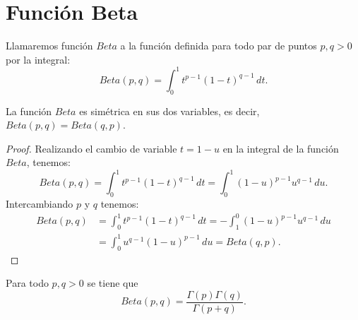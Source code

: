 \section{Función Beta}
\begin{definition}
    Llamaremos función $Beta$  a la función definida
    para todo par de puntos $p,q>0$ por la integral:
    \[
    Beta(p,q)=\int_{0}^{1}t^{p-1}(1-t)^{q-1}\,dt.    
    \]
\end{definition}


\begin{theorem}
    La función $Beta$ es simétrica en sus dos variables, es decir,
    $Beta(p,q)=Beta(q,p)$.
\end{theorem}

\begin{proof}
    Realizando el cambio de variable $t = 1-u$ en la integral
    de la función $Beta$, tenemos:
    \[
        Beta(p,q)=\int_{0}^{1}t^{p-1}(1-t)^{q-1}\,dt=
        \int_{0}^{1}(1-u)^{p-1}u^{q-1}\,du.
    \]
    Intercambiando $p$ y $q$ tenemos:
    \begin{align*}
        Beta(p,q)&=\int_{0}^{1}t^{p-1}(1-t)^{q-1}\,dt=
        -\int_{1}^{0}(1-u)^{p-1}u^{q-1}\,du\\
        &=\int_{0}^{1}u^{q-1}(1-u)^{p-1}\,du=Beta(q,p).
    \end{align*}
        
\end{proof}

\begin{theorem}
    Para todo $p,q>0$ se tiene que
    \[
        Beta(p,q)=\frac{\Gamma(p)\Gamma(q)}{\Gamma(p+q)}.
    \]
\end{theorem}

